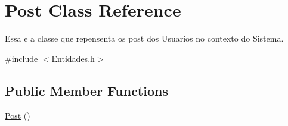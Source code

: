 \hypertarget{class_post}{\section{Post Class Reference}
\label{class_post}
}


Essa e a classe que repensenta os post dos Usuarios no contexto do Sistema.  




{\ttfamily \#include $<$Entidades.\-h$>$}

\subsection*{Public Member Functions}
\begin{DoxyCompactItemize}
\item 
\hypertarget{class_post_a1327e448954d596eda1868d3badb5892}{\hyperlink{class_post_a1327e448954d596eda1868d3badb5892}{Post} ()}\label{class_post_a1327e448954d596eda1868d3badb5892}


\end{DoxyCompactItemize}

